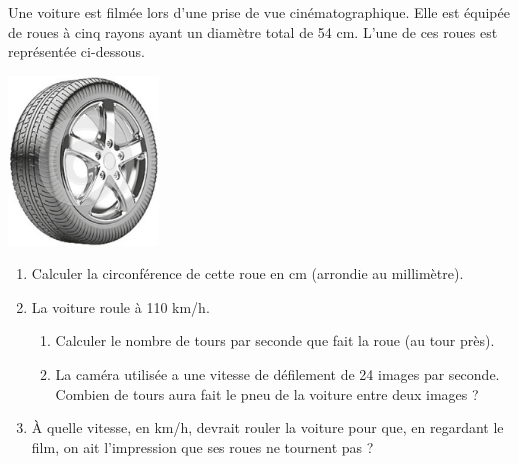 \begin{exercice}[CRPE 2018 G1]
   Une voiture est filmée lors d’une prise de vue cinématographique. Elle est équipée de roues à cinq rayons ayant un diamètre total de 54 cm.    L’une de ces roues est représentée ci-dessous.
   \begin{center}
      \includegraphics[width=4cm]{Organisation_gestion_donnees/Images/D6_ex_roue}
   \end{center}
   \begin{enumerate}
      \item Calculer la circonférence de cette roue en cm (arrondie au millimètre).
      \item La voiture roule à 110 km/h.
         \begin{enumerate}
            \item Calculer le nombre de tours par seconde que fait la roue (au tour près).
            \item La caméra utilisée a une vitesse de défilement de 24 images par seconde. \\
               Combien de tours aura fait le pneu de la voiture entre deux images ?
         \end{enumerate}
      \item À quelle vitesse, en km/h, devrait rouler la voiture pour que, en regardant le film, on ait l’impression que ses roues ne tournent pas ?
   \end{enumerate}
\end{exercice}

